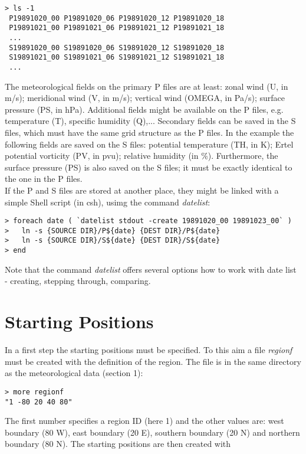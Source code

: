 \documentclass[a4paper,10pt]{article}
\begin{document}
\begin{verbatim}
> ls -1
 P19891020_00 P19891020_06 P19891020_12 P19891020_18 
 P19891021_00 P19891021_06 P19891021_12 P19891021_18
 ... 
 S19891020_00 S19891020_06 S19891020_12 S19891020_18 
 S19891021_00 S19891021_06 S19891021_12 S19891021_18
 ...
\end{verbatim}

\noindent
The meteorological fields on the primary P files are at least: zonal wind (U, in m/s); meridional wind (V, in m/s); vertical wind (OMEGA, in Pa/s); 
surface pressure (PS, in hPa). Additional fields might be available on the P files, e.g. temperature (T), specific
humidity (Q),... Secondary fields can be saved in the S files, which must have the same grid structure as the P files.
In the example the following fields are saved on the S files: potential temperature (TH, in K); Ertel potential vorticity (PV, in pvu); relative humidity (in \%). 
Furthermore, the surface pressure (PS) is also saved on the S files; it must be exactly identical to the one in the P files.\\

\noindent
If the P and S files are stored at another place, they might be linked with a simple Shell script (in csh), usimg the command {\em datelist}:
\begin{verbatim}
> foreach date ( `datelist stdout -create 19891020_00 19891023_00` )
>   ln -s {SOURCE DIR}/P${date} {DEST DIR}/P${date}
>   ln -s {SOURCE DIR}/S${date} {DEST DIR}/S${date}
> end
\end{verbatim}
Note that the command {\em datelist} offers several options how to work with date list - creating, stepping through, comparing.

\section{Starting Positions}

In a first step the starting positions must be specified. To this aim a file {\em regionf} must be created with the definition of the region. The file is in the same directory as the meteorological data (section 1):

\begin{verbatim}
> more regionf 
"1 -80 20 40 80"
\end{verbatim}
  
\noindent
The first number specifies a region ID (here 1) and the other values are: west boundary (80 W), east boundary (20 E), southern boundary (20 N) and northern boundary (80 N). The starting positions are then created with
\end{document}

